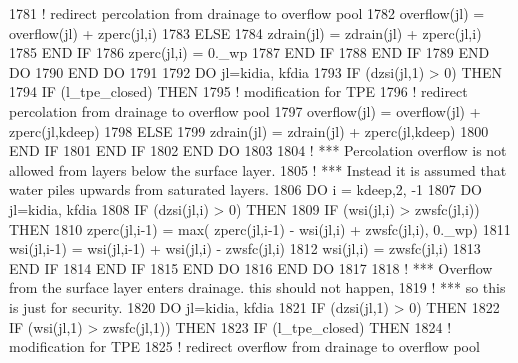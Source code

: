 \begin{DoxyCode}
1781             \textcolor{comment}{! redirect percolation from drainage to overflow pool}
1782             overflow(jl) = overflow(jl) + zperc(jl,i)
1783           \textcolor{keywordflow}{ELSE}
1784             zdrain(jl) = zdrain(jl) + zperc(jl,i)
1785 \textcolor{keywordflow}{          END IF}
1786           zperc(jl,i) = 0.\_wp
1787 \textcolor{keywordflow}{        END IF}
1788 \textcolor{keywordflow}{      END IF}
1789 \textcolor{keywordflow}{    END DO}
1790 \textcolor{keywordflow}{  END DO}
1791 
1792   \textcolor{keywordflow}{DO} jl=kidia, kfdia
1793     \textcolor{keywordflow}{IF} (dzsi(jl,1) > 0) \textcolor{keywordflow}{THEN}
1794       \textcolor{keywordflow}{IF} (l\_tpe\_closed) \textcolor{keywordflow}{THEN}
1795         \textcolor{comment}{! modification for TPE}
1796         \textcolor{comment}{! redirect percolation from drainage to overflow pool}
1797         overflow(jl) = overflow(jl) + zperc(jl,kdeep)
1798       \textcolor{keywordflow}{ELSE}
1799         zdrain(jl) = zdrain(jl) + zperc(jl,kdeep)
1800 \textcolor{keywordflow}{      END IF}
1801 \textcolor{keywordflow}{    END IF}
1802 \textcolor{keywordflow}{  END DO}
1803 
1804 \textcolor{comment}{! *** Percolation overflow is not allowed from layers below the surface layer.}
1805 \textcolor{comment}{! *** Instead it is assumed that water piles upwards from saturated layers.}
1806   \textcolor{keywordflow}{DO} i = kdeep,2, -1
1807     \textcolor{keywordflow}{DO} jl=kidia, kfdia
1808       \textcolor{keywordflow}{IF} (dzsi(jl,i) > 0) \textcolor{keywordflow}{THEN}
1809         \textcolor{keywordflow}{IF} (wsi(jl,i) > zwsfc(jl,i)) \textcolor{keywordflow}{THEN}
1810           zperc(jl,i-1) = max( zperc(jl,i-1) - wsi(jl,i) + zwsfc(jl,i), 0.\_wp)
1811           wsi(jl,i-1) = wsi(jl,i-1) + wsi(jl,i) - zwsfc(jl,i)
1812           wsi(jl,i) = zwsfc(jl,i)
1813 \textcolor{keywordflow}{        END IF}
1814 \textcolor{keywordflow}{      END IF}
1815 \textcolor{keywordflow}{    END DO}
1816 \textcolor{keywordflow}{  END DO}
1817 
1818 \textcolor{comment}{! *** Overflow from the surface layer enters drainage. this should not happen,}
1819 \textcolor{comment}{! *** so this is just for security.}
1820   \textcolor{keywordflow}{DO} jl=kidia, kfdia
1821     \textcolor{keywordflow}{IF} (dzsi(jl,1) > 0) \textcolor{keywordflow}{THEN}
1822       \textcolor{keywordflow}{IF} (wsi(jl,1) > zwsfc(jl,1)) \textcolor{keywordflow}{THEN}
1823         \textcolor{keywordflow}{IF} (l\_tpe\_closed) \textcolor{keywordflow}{THEN}
1824           \textcolor{comment}{! modification for TPE}
1825           \textcolor{comment}{! redirect overflow from drainage to overflow pool}

\end{DoxyCode}
